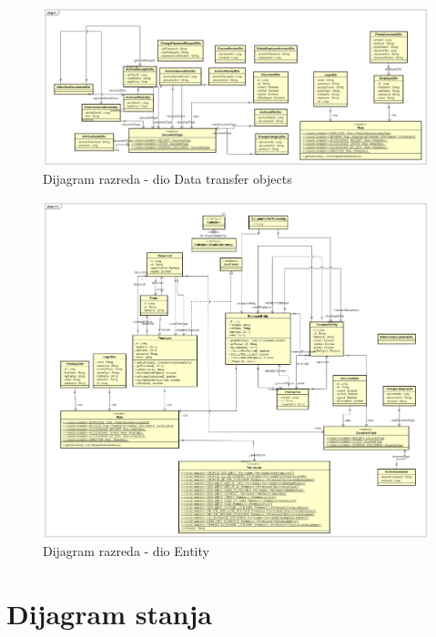 			\begin{figure}[H]
				\includegraphics[scale=0.5]{slike/dijagram_razreda_dto.png} %
				\centering
				\caption{Dijagram razreda - dio Data transfer objects}
				\label{fig:promjene}
			\end{figure}

			\begin{figure}[H]
				\includegraphics[scale=0.5]{slike/dijagram_razreda_entity.png} %
				\centering
				\caption{Dijagram razreda - dio Entity}
				\label{fig:promjene}
			\end{figure}
			
			
			
			\eject
		
		\iffalse
		\section{Dijagram stanja}
			
